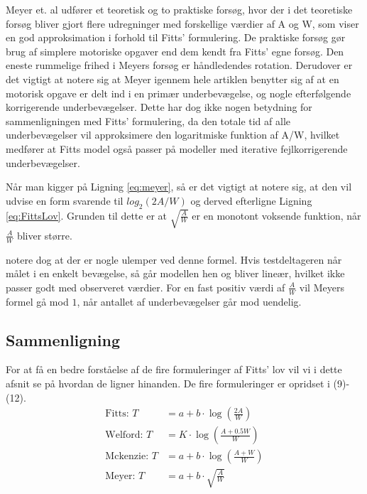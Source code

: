Meyer et. al udfører et teoretisk og to praktiske forsøg, hvor der i det teoretiske forsøg bliver gjort flere udregninger med forskellige værdier af A og W, som viser en god approksimation i forhold til Fitts' formulering. De praktiske forsøg gør brug af simplere motoriske opgaver end dem kendt fra Fitts' egne forsøg. Den eneste rummelige frihed i Meyers forsøg er håndledendes rotation. Derudover er det vigtigt at notere sig at Meyer igennem hele artiklen benytter sig af at en motorisk opgave er delt ind i en primær underbevægelse, og nogle efterfølgende korrigerende underbevægelser. Dette har dog ikke nogen betydning for sammenligningen med Fitts’ formulering, da den totale tid af alle underbevægelser vil approksimere den logaritmiske funktion af A/W, hvilket medfører at Fitts model også passer på modeller med iterative fejlkorrigerende underbevægelser.

Når man kigger på Ligning \ref{eq:meyer}, så er det vigtigt at notere sig, at den vil udvise en form svarende til $log_2(2A/W)$ og derved efterligne Ligning \ref{eq:FittsLov}. Grunden til dette er at $\sqrt{\frac{A}{W}}$ er en monotont voksende funktion, når $\frac{A}{W}$ bliver større. 

\cite{goldberg2015} notere dog at der er nogle ulemper ved denne formel. Hvis testdeltageren når målet i en enkelt bevægelse, så går modellen hen og bliver lineær, hvilket ikke passer godt med observeret værdier. For en fast positiv værdi af $\frac{A}{W}$ vil Meyers formel gå mod $1$, når antallet af underbevægelser går mod uendelig.

\subsection*{Sammenligning}
For at få en bedre forståelse af de fire formuleringer af Fitts' lov vil vi i dette afsnit se på hvordan de ligner hinanden. De fire formuleringer er opridset i (9)-(12). 
\begin{align}
\text{Fitts: } T &= a+b\cdot\log\left(\frac{2A}{W}\right)\\
\text{Welford: } T &= K\cdot\log\left(\frac{A+0.5W}{W}\right)\\
\text{Mckenzie: } T &= a+b\cdot\log\left(\frac{A+W}{W}\right)\\
\text{Meyer: } T &= a+b\cdot\sqrt{\frac{A}{W}}
\end{align}

